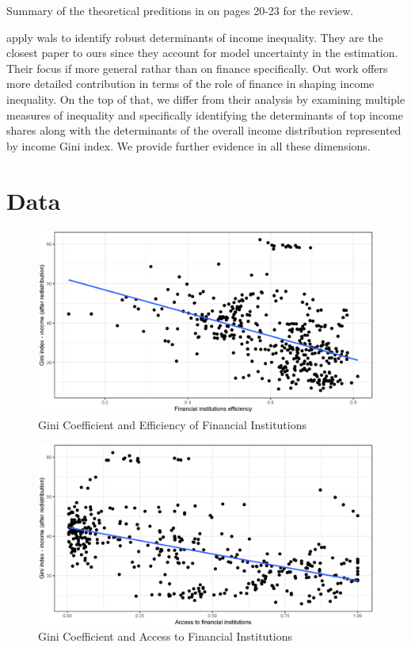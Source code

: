 \documentclass[a4paper,11pt]{article}
\begin{document}
Summary of the theoretical preditions in \citet{demirgucc2009finance} on pages 20-23 for the review.

\citet{furceri2019robust} apply \ac{wals} to identify robust determinants of income inequality. They are the closest paper to ours since they account for model uncertainty in the estimation. Their focus if more general rathar than on finance specifically. Out work offers more detailed contribution in terms of the role of finance in shaping income inequality. On the top of that, we differ from their analysis by examining multiple measures of inequality and specifically identifying the determinants of top income shares along with the determinants of the overall income distribution represented by income Gini index. We provide further evidence in all these dimensions.

\section{Data}
\begin{figure}
    \caption{Gini Coefficient and Efficiency of Financial Institutions}
    \label{fig:ginifie}
\includegraphics[width=\textwidth, keepaspectratio]{figures/FIEGiniNet}
\end{figure}

\begin{figure}
    \caption{Gini Coefficient and Access to Financial Institutions}
    \label{fig:ginifia}
\includegraphics[width=\textwidth, keepaspectratio]{figures/FIAGiniNet}
\end{figure}
\end{document}
